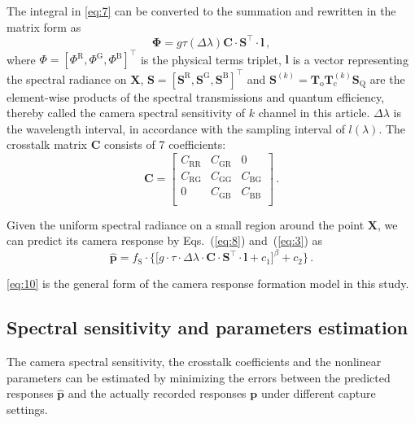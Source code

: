 \documentclass[9pt,twocolumn,twoside]{osajnl}
\begin{document}
The integral in \eqref{eq:7} can be converted to the summation and rewritten in the matrix form as
\begin{equation}
\mathbf{\Phi} = g\tau(\Delta\lambda)\mathbf{C}\cdot\mathbf{S}^\intercal\cdot\mathbf{l}\,,
\label{eq:8}
\end{equation}
where $\Phi = \left[\Phi^\text{R},\Phi^\text{G},\Phi^\text{B}\right]^\intercal$ is the physical terms triplet, $\mathbf{l}$ is a vector representing the spectral radiance on $\mathbf{X}$, $\mathbf{S} = \left[\mathbf{S}^\text{R},\mathbf{S}^\text{G},\mathbf{S}^\text{B}\right]^\intercal$ and $\mathbf{S}^{(k)} = \mathbf{T}_\text{o}\mathbf{T}_\text{c}^{(k)}\mathbf{S}_\text{Q}$ are the element-wise products of the spectral transmissions and quantum efficiency, thereby called the camera spectral sensitivity of $k$ channel in this article. $\Delta\lambda$ is the wavelength interval, in accordance with the sampling interval of $l(\lambda)$. The crosstalk matrix $\mathbf{C}$ consists of 7 coefficients:
\begin{equation}
\mathbf{C} = \begin{bmatrix}
C_\text{RR} & C_\text{GR} & 0 \\
C_\text{RG} & C_\text{GG} & C_\text{BG} \\
0			& C_\text{GB} & C_\text{BB} \\
\end{bmatrix}\,.
\label{eq:9}
\end{equation}

Given the uniform spectral radiance on a small region around the point $\mathbf{X}$, we can predict its camera response by Eqs.~(\ref{eq:8}) and~(\ref{eq:3}) as
\begin{equation}
\hat{\mathbf{p}} = f_\text{S}\cdot\bigg\{\Big[g\cdot{}\tau \cdot\Delta\lambda\cdot\mathbf{C}\cdot\mathbf{S}^\intercal\cdot\mathbf{l} + c_1\Big]^\beta + c_2\bigg\}\,.
\label{eq:10}
\end{equation}

\eqref{eq:10} is the general form of the camera response formation model in this study.

\subsection{Spectral sensitivity and parameters estimation}\label{sec:estimation}

The camera spectral sensitivity, the crosstalk coefficients and the nonlinear parameters can be estimated by minimizing the errors between the predicted responses $\hat{\mathbf{p}}$ and the actually recorded responses $\mathbf{p}$ under different capture settings.
\end{document}
